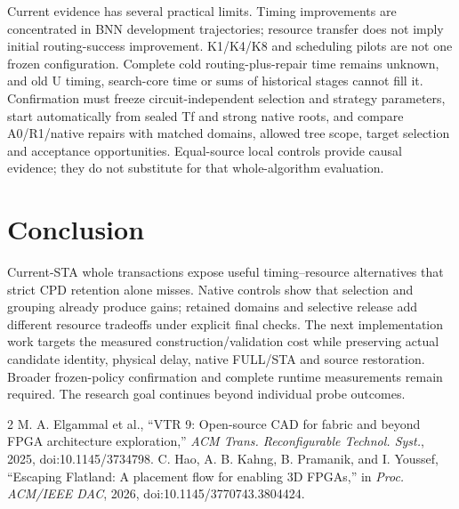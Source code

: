 \documentclass[conference,10pt]{IEEEtran}
\begin{document}
Current evidence has several practical limits. Timing improvements are concentrated in BNN development trajectories; resource transfer does not imply initial routing-success improvement. K1/K4/K8 and scheduling pilots are not one frozen configuration. Complete cold routing-plus-repair time remains unknown, and old U timing, search-core time or sums of historical stages cannot fill it. Confirmation must freeze circuit-independent selection and strategy parameters, start automatically from sealed Tf and strong native roots, and compare A0/R1/native repairs with matched domains, allowed tree scope, target selection and acceptance opportunities. Equal-source local controls provide causal evidence; they do not substitute for that whole-algorithm evaluation.

\section{Conclusion}
Current-STA whole transactions expose useful timing--resource alternatives that strict CPD retention alone misses. Native controls show that selection and grouping already produce gains; retained domains and selective release add different resource tradeoffs under explicit final checks. The next implementation work targets the measured construction/validation cost while preserving actual candidate identity, physical delay, native FULL/STA and source restoration. Broader frozen-policy confirmation and complete runtime measurements remain required. The research goal continues beyond individual probe outcomes.

\begin{thebibliography}{2}
 M. A. Elgammal et al., ``VTR 9: Open-source CAD for fabric and beyond FPGA architecture exploration,'' \emph{ACM Trans. Reconfigurable Technol. Syst.}, 2025, doi:10.1145/3734798.
 C. Hao, A. B. Kahng, B. Pramanik, and I. Youssef, ``Escaping Flatland: A placement flow for enabling 3D FPGAs,'' in \emph{Proc. ACM/IEEE DAC}, 2026, doi:10.1145/3770743.3804424.
\end{thebibliography}
\end{document}
